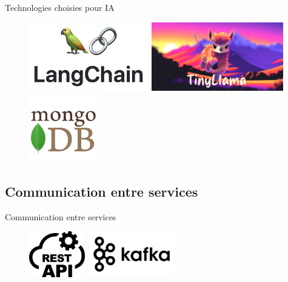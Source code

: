 \documentclass{beamer}
\begin{document}
\begin{frame}{Technologies choisies pour IA}
    \begin{figure}[htpb]
        \centering
       
        \begin{minipage}{0.32\textwidth}
            \centering
            \includegraphics[height=3cm]{pic/langchain.jpeg}
        \end{minipage}
        \hspace{0.1\textwidth}
        \begin{minipage}{0.32\textwidth}
            \centering
            \includegraphics[height=3cm]{pic/tinyllama.png}
        \end{minipage}
        \hspace{0.1\textwidth}
        \begin{minipage}{0.32\textwidth}
            \centering
            \includegraphics[height=3cm]{pic/mongo.png}
        \end{minipage}
    \end{figure}
\end{frame}

\subsection{Communication entre services}
\begin{frame}{Communication entre services}
   \begin{figure}[htpb]
        \centering
        \includegraphics[height=2cm]{pic/rest.png}
         \hspace{0.1\textwidth}
         \includegraphics[height=2cm]{pic/kafka.png}
    \end{figure}
\end{frame}
\end{document}
